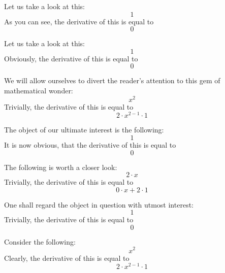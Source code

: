 \documentclass{article}
\begin{document}
Let us take a look at this:
\begin{equation}
1 
\end{equation}
As you can see, the derivative of this is equal to
\begin{equation}
0 
\end{equation}

Let us take a look at this:
\begin{equation}
1 
\end{equation}
Obviously, the derivative of this is equal to
\begin{equation}
0 
\end{equation}

We will allow ourselves to divert the reader's attention to this gem of mathematical wonder:
\begin{equation}
x ^{2 } 
\end{equation}
Trivially, the derivative of this is equal to
\begin{equation}
2 \cdot x ^{2 - 1 } \cdot 1 
\end{equation}

The object of our ultimate interest is the following:
\begin{equation}
1 
\end{equation}
It is now obvious, that the derivative of this is equal to
\begin{equation}
0 
\end{equation}

The following is worth a closer look:
\begin{equation}
2 \cdot x 
\end{equation}
Trivially, the derivative of this is equal to
\begin{equation}
0 \cdot x + 2 \cdot 1 
\end{equation}

One shall regard the object in question with utmost interest:
\begin{equation}
1 
\end{equation}
Trivially, the derivative of this is equal to
\begin{equation}
0 
\end{equation}

Consider the following:
\begin{equation}
x ^{2 } 
\end{equation}
Clearly, the derivative of this is equal to
\begin{equation}
2 \cdot x ^{2 - 1 } \cdot 1 
\end{equation}
\end{document}

